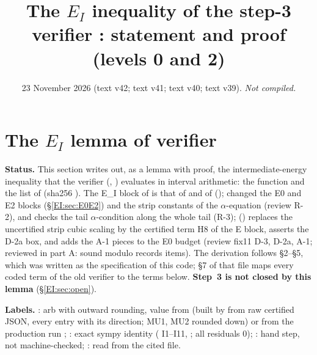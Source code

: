 \documentclass[11pt]{article}
\title{The $E_I$ inequality of the step-3 verifier \fn{fin13v4c}: statement and proof (levels 0 and 2)}
\author{}\date{23 November 2026 (text v42; text v41; text v40; text v39). \emph{Not compiled.}}
\begin{document}
\maketitle
\fi
\providecommand{\Dv}{\mathcal D_V}

\section{The $E_I$ lemma of verifier }\label{EI:sec}
\noindent\textbf{Status.} This section writes out, as a lemma with proof, the intermediate-energy inequality that the verifier  (, ) evaluates in interval arithmetic: the function  and the list  of  (sha256 ). The E\_I block of  is that of  and of  ();  changed the E0 and E2 blocks (\S\ref{EI:sec:E0E2}) and the strip constants of the $\alpha$-equation (review R-2), and checks the tail $\alpha$-condition along the whole tail (R-3);  () replaces the uncertified strip cubic scaling  by the certified term H8 of the E block, asserts the D-2a box, and adds the A-1 pieces to the E0 budget (review fix11 D-3, D-2a, A-1; reviewed in  part A: sound modulo records items). The derivation follows  \S2--\S5, which was written as the specification of this code; \S7 of that file maps every coded term of the old verifier  to the terms below. \textbf{Step~3 is not closed by this lemma} (\S\ref{EI:sec:open}).

\noindent\textbf{Labels.} \tC: arb with outward rounding, value from  (built by  from raw certified JSON, every entry with its direction; MU1, MU2 rounded down) or from the production run ; \tS: exact sympy identity ( I1--I11, ; all residuals 0); \tHd: hand step, not machine-checked; \tR: read from the cited file.
\end{document}
